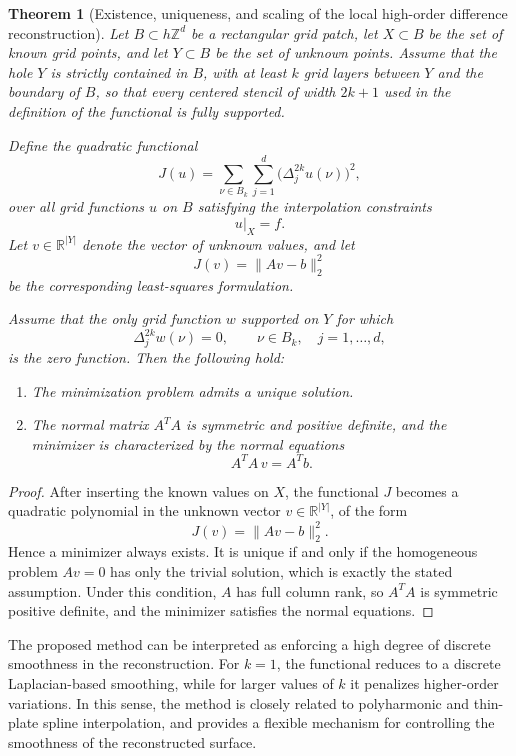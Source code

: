 \documentclass[11pt,oneside,reqno]{amsart}
\theoremstyle{plain}
\newtheorem{theorem}{Theorem}[section]
\numberwithin{equation}{section}
\begin{document}
\begin{theorem}[Existence, uniqueness, and scaling of the local
high-order difference reconstruction]
Let $B\subset h\mathbb{Z}^d$ be a rectangular grid patch,
let $X\subset B$ be the set of known grid points,
and let $Y\subset B$ be the set of unknown points.
Assume that the hole $Y$ is strictly contained in $B$,
with at least $k$ grid layers between $Y$
and the boundary of $B$,
so that every centered stencil of width $2k+1$
used in the definition of the functional is fully supported.

Define the quadratic functional
\[
J(u)
=
\sum_{\nu\in B_k}\sum_{j=1}^d
\bigl(\Delta_j^{2k}u(\nu)\bigr)^2,
\]
over all grid functions $u$ on $B$
satisfying the interpolation constraints
\[
u|_X=f.
\]
Let $v\in\mathbb{R}^{|Y|}$ denote the vector of unknown values,
and let
\[
J(v)=\|Av-b\|_2^2
\]
be the corresponding least-squares formulation.

Assume that the only grid function $w$ supported on $Y$
for which
\[
\Delta_j^{2k} w(\nu)=0,
\qquad \nu\in B_k,\quad j=1,\dots,d,
\]
is the zero function.
Then the following hold:

\begin{enumerate}
\item[(i)]
The minimization problem admits a unique solution.

\item[(ii)]
The normal matrix $A^TA$ is symmetric and positive definite,
and the minimizer is characterized by the normal equations
\[
A^TA\,v=A^Tb.
\]
\end{enumerate}
\end{theorem}

\begin{proof}
After inserting the known values on $X$,
the functional $J$ becomes a quadratic polynomial
in the unknown vector $v\in\mathbb{R}^{|Y|}$,
of the form
\[
J(v)=\|Av-b\|_2^2.
\]
Hence a minimizer always exists.
It is unique if and only if the homogeneous problem
$Av=0$ has only the trivial solution,
which is exactly the stated assumption.
Under this condition, $A$ has full column rank,
so $A^TA$ is symmetric positive definite,
and the minimizer satisfies the normal equations.
\end{proof}

The proposed method can be interpreted as enforcing a high degree of
discrete smoothness in the reconstruction.
For $k=1$, the functional reduces to a discrete Laplacian-based
smoothing, while for larger values of $k$ it penalizes higher-order
variations.
In this sense, the method is closely related to polyharmonic and
thin-plate spline interpolation, and provides a flexible mechanism for
controlling the smoothness of the reconstructed surface.
\end{document}
